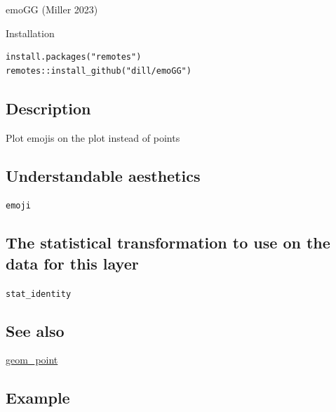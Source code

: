 \documentclass[
  letterpaper,
  DIV=11,
  numbers=noendperiod]{scrreprt}
\begin{document}
emoGG (Miller 2023)

Installation

\begin{verbatim}
install.packages("remotes")
remotes::install_github("dill/emoGG")
\end{verbatim}

\subsection{Description}\label{description-3}

Plot emojis on the plot instead of points

\subsection{Understandable
aesthetics}\label{understandable-aesthetics-4}

\texttt{emoji}

\subsection{The statistical transformation to use on the data for this
layer}\label{the-statistical-transformation-to-use-on-the-data-for-this-layer-3}

\texttt{stat\_identity}

\subsection{See also}\label{see-also-3}

\hyperref[point]{geom\_point}

\subsection{Example}\label{example-4}
\end{document}
